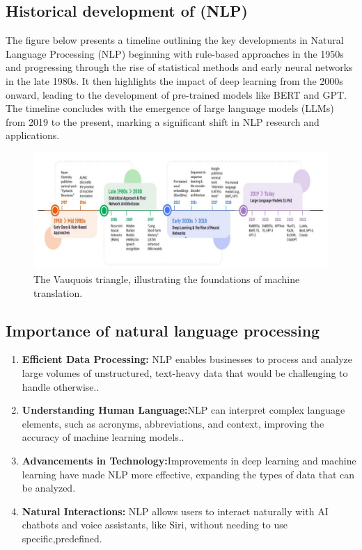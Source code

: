 \subsection{Historical development of (NLP)}
The figure below presents a timeline outlining the key developments in Natural Language Processing (NLP)  beginning with rule-based approaches in the 1950s and progressing through the rise of statistical methods and early neural networks in the late 1980s. It then highlights the impact of deep learning from the 2000s onward, leading to the development of pre-trained models like BERT and GPT. The timeline concludes with the emergence of large language models (LLMs) from 2019 to the present, marking a significant shift in NLP research and applications.
\begin{figure}[htbp]
	\centerline{\includegraphics[scale=.7]{Figures/the_historyOf_nlp.png}}
	\caption{The Vauquois triangle, illustrating the foundations of machine translation.}
	\label{the_historyOf_nlp.png}
\end{figure}

\subsection{Importance of natural language processing}

\begin{enumerate}
	\item \textbf{Efficient Data Processing:} NLP enables businesses to process and analyze large volumes of unstructured, text-heavy data that would be challenging to handle otherwise..

	\item \textbf{Understanding Human Language:}NLP can interpret complex language elements, such as acronyms, abbreviations, and context, improving the accuracy of machine learning models..
	
	\item \textbf{Advancements in Technology:}Improvements in deep learning and machine learning have made NLP more effective, expanding the types of data that can be analyzed.
	
	\item \textbf{Natural Interactions:} NLP allows users to interact naturally with AI chatbots and voice assistants, like Siri, without needing to use specific,predefined\cite{techtarget_nlp}.
	
\end{enumerate}

